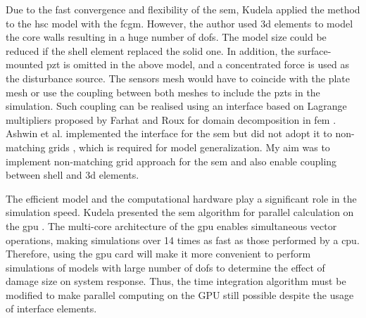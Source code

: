 Due to the fast convergence and flexibility of the \ac{sem}, Kudela \cite{kudela2016parallel} applied the method to the \ac{hsc} model with the \ac{fcgm}.
However, the author used \ac{3d} elements to model the core walls resulting in a huge number of \acp{dof}.
The model size could be reduced if the shell element replaced the solid one.
In addition, the surface-mounted \ac{pzt} is omitted in the above model, and a concentrated force is used as the disturbance source.
The sensors mesh would have to coincide with the plate mesh or use the coupling between both meshes to include the \acp{pzt} in the simulation.
Such coupling can be realised using an interface based on Lagrange multipliers proposed by Farhat and Roux for domain decomposition in \ac{fem} \cite{farhat1991method}.
Ashwin et al. implemented the interface for the \ac{sem} but did not adopt it to non-matching grids \cite{ashwin2014formulation}, which is required for model generalization.
My aim was to implement non-matching grid approach for the \ac{sem} and also enable coupling between shell and \ac{3d} elements.

The efficient model and the computational hardware play a significant role in the simulation speed. 
Kudela presented the \ac{sem} algorithm for parallel calculation on the \ac{gpu} \cite{kudela2016parallel}.
The multi-core architecture of the \ac{gpu} enables simultaneous vector operations, making simulations over 14 times as fast as those performed by a \ac{cpu}.
Therefore, using the \ac{gpu} card will make it more convenient to perform simulations of models with large number of \acp{dof} to determine the effect of damage size on system response.
Thus, the time integration algorithm must be modified to make parallel computing on the GPU still possible despite the usage of interface elements.
